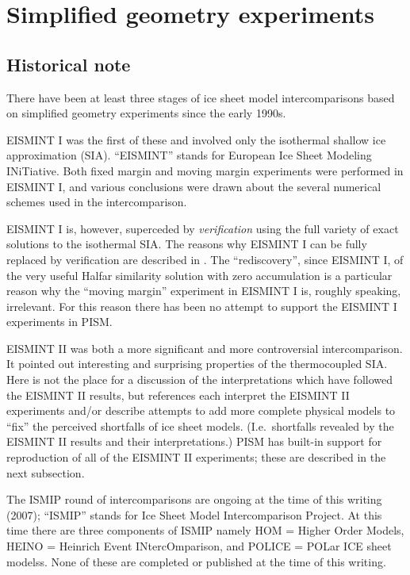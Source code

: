 \documentclass[11pt,final]{amsart}
\begin{document}
\clearpage\newpage
\section{Simplified geometry experiments}\label{sect:simp}

\subsection{Historical note}  There have been at least three stages of ice sheet model intercomparisons based on simplified geometry experiments since the early 1990s.

EISMINT I \cite{EISMINT96} was the first of these and involved only the isothermal shallow ice approximation (SIA).  ``EISMINT'' stands for European Ice Sheet Modeling INiTiative.  Both fixed margin and moving margin experiments were performed in EISMINT I, and various conclusions were drawn about the several numerical schemes used in the intercomparison.  

EISMINT I is, however, superceded by \emph{verification} using the full variety of exact solutions to the isothermal SIA.  The reasons why EISMINT I can be fully replaced by verification are described in \cite{BLKCB}.  The ``rediscovery'', since EISMINT I, of the very useful Halfar similarity solution with zero accumulation \cite{Halfar83} is a particular reason why the ``moving margin'' experiment in EISMINT I is, roughly speaking, irrelevant.  For this reason there has been no attempt to support the EISMINT I experiments in PISM.

EISMINT II \cite{EISMINT00} was both a more significant and more controversial intercomparison.  It pointed out interesting and surprising properties of the thermocoupled SIA.  Here is not the place for a discussion of the interpretations which have followed the EISMINT II results, but references \cite{BBL,Hindmarsh04,Hindmarsh06,PayneBaldwin,SaitoEISMINT} each interpret the EISMINT II experiments and/or describe attempts to add more complete physical models to ``fix'' the perceived shortfalls of ice sheet models.   (I.e.~shortfalls revealed by the EISMINT II results and their interpretations.)  PISM has built-in support for reproduction of all of the EISMINT II experiments; these are described in the next subsection.

The ISMIP round of intercomparisons are ongoing at the time of this writing (2007); ``ISMIP'' stands for Ice Sheet Model Intercomparison Project.  At this time there are three components of ISMIP namely HOM = Higher Order Models, HEINO = Heinrich Event INtercOmparison, and POLICE = POLar ICE sheet modelss.  None of these are completed or published at the time of this writing.
\end{document}
